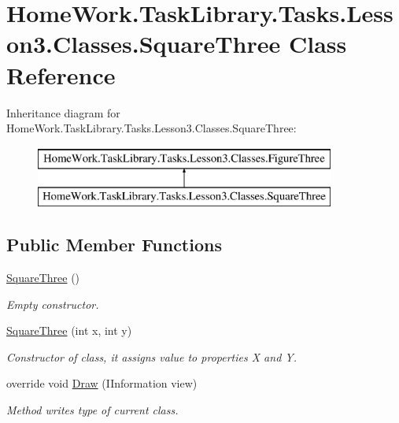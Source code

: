 \hypertarget{class_home_work_1_1_task_library_1_1_tasks_1_1_lesson3_1_1_classes_1_1_square_three}{}\section{Home\+Work.\+Task\+Library.\+Tasks.\+Lesson3.\+Classes.\+Square\+Three Class Reference}
\label{class_home_work_1_1_task_library_1_1_tasks_1_1_lesson3_1_1_classes_1_1_square_three}
Inheritance diagram for Home\+Work.\+Task\+Library.\+Tasks.\+Lesson3.\+Classes.\+Square\+Three\+:\begin{figure}[H]
\begin{center}
\leavevmode
\includegraphics[height=2.000000cm]{class_home_work_1_1_task_library_1_1_tasks_1_1_lesson3_1_1_classes_1_1_square_three}
\end{center}
\end{figure}
\subsection*{Public Member Functions}
\begin{DoxyCompactItemize}
\item 
\mbox{\hyperlink{class_home_work_1_1_task_library_1_1_tasks_1_1_lesson3_1_1_classes_1_1_square_three_aa2d58dbb67bd1c6c6c5cec8d4293edd5}{Square\+Three}} ()
\begin{DoxyCompactList}\small\item\em Empty constructor. \end{DoxyCompactList}\item 
\mbox{\hyperlink{class_home_work_1_1_task_library_1_1_tasks_1_1_lesson3_1_1_classes_1_1_square_three_a357bd2826cb65d4276155a11e73bd49a}{Square\+Three}} (int x, int y)
\begin{DoxyCompactList}\small\item\em Constructor of class, it assigns value to properties X and Y. \end{DoxyCompactList}\item 
override void \mbox{\hyperlink{class_home_work_1_1_task_library_1_1_tasks_1_1_lesson3_1_1_classes_1_1_square_three_ab8713407ad8a5ba3f38785748aaa1847}{Draw}} (I\+Information view)
\begin{DoxyCompactList}\small\item\em Method writes type of current class. \end{DoxyCompactList}\end{DoxyCompactItemize}
